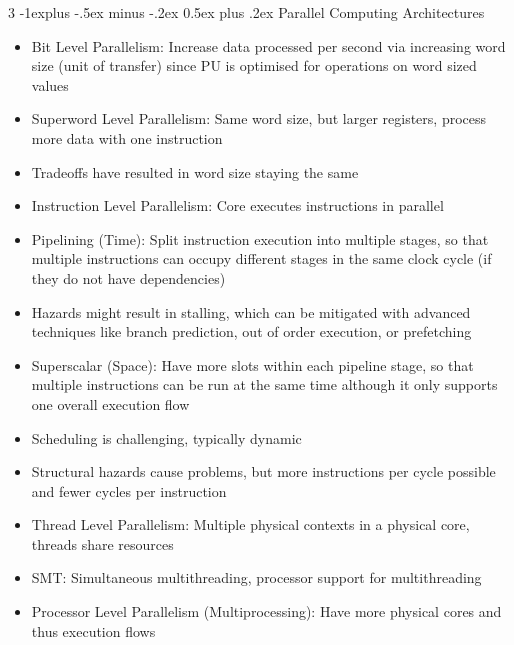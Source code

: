 \documentclass[10pt, landscape]{article}
\makeatletter
\renewcommand{\section}{\@startsection{section}{1}{0mm}%
                                {-1ex plus -.5ex minus -.2ex}%
                                {0.5ex plus .2ex}%
                                {\normalfont\large\bfseries}}
\renewcommand{\section}{\@startsection{section}{2}{0mm}%
                                {-1explus -.5ex minus -.2ex}%
                                {0.5ex plus .2ex}%
                                {\normalfont\normalsize\bfseries}}
\makeatother
\begin{document}
\begin{multicols*}{3}
\section{Parallel Computing Architectures}
\begin{itemize}
    \item Bit Level Parallelism: Increase data processed per second via increasing word size (unit of transfer) since PU is optimised for operations on word sized values
    \item Superword Level Parallelism: Same word size, but larger registers, process more data with one instruction
    \item Tradeoffs have resulted in word size staying the same
    \item Instruction Level Parallelism: Core executes instructions in parallel
    \item Pipelining (Time): Split instruction execution into multiple stages, so that multiple instructions can occupy different stages in the same clock cycle (if they do not have dependencies)
    \item Hazards might result in stalling, which can be mitigated with advanced techniques like branch prediction, out of order execution, or prefetching
    \item Superscalar (Space): Have more slots within each pipeline stage, so that multiple instructions can be run at the same time although it only supports one overall execution flow
    \item Scheduling is challenging, typically dynamic
    \item Structural hazards cause problems, but more instructions per cycle possible and fewer cycles per instruction
    \item Thread Level Parallelism: Multiple physical contexts in a physical core, threads share resources
    \item SMT: Simultaneous multithreading, processor support for multithreading
    \item Processor Level Parallelism (Multiprocessing): Have more physical cores and thus execution flows
\end{itemize}


\end{multicols*}
\end{document}
